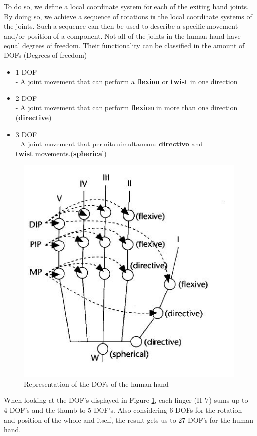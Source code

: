 To do so, we define a local coordinate system for each of the exiting hand joints. By doing so, we achieve a sequence of rotations in the local coordinate systems of the joints. Such a sequence can then be used to describe a specific movement and/or position of a component.
Not all of the joints in the human hand have equal degrees of freedom. Their functionality can be classified in the amount of DOFs (Degrees of freedom)\cite{KOREIN.1985}
\begin{itemize}
\item 1 DOF \\
- A joint movement that can perform a \textbf{flexion} or \textbf{twist} in one direction
\item 2 DOF \\
- A joint movement that can perform \textbf{flexion} in more than one direction\\ (\textbf{directive})
\item 3 DOF\\
- A joint movement that permits simultaneous \textbf{directive} and \\ \textbf{twist} movements.(\textbf{spherical})
\end{itemize}
\begin{figure}[H]
\includegraphics[scale=0.8]{images/Hand_DOFs.JPG} 
\caption{Representation of the DOFs of the human hand}
\label{dof_image} 
\end{figure}
When looking at the DOF's displayed in Figure \ref{dof_image}, each finger (II-V) sums up to 4 DOF's and the thumb to 5 DOF's. Also considering 6 DOFs for the rotation and position of the whole and itself, the result gets us to 27 DOF's  for the human hand.
